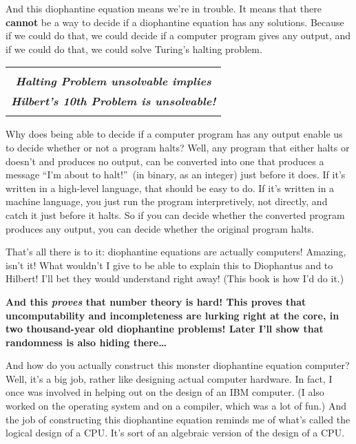 \documentclass[12pt]{book}
\begin{document}
And this diophantine equation means we're in trouble. It means that there \textbf{cannot}
be a way to decide if a diophantine equation has any solutions. Because if we could do that,
we could decide if a computer program gives any output, and if we could do that, we could
solve Turing's halting problem. 

\begin{center}
\begin{tabular}{|c|}
\hline
\\
\textbf{\emph{\large Halting Problem unsolvable implies}}
\\
\textbf{\emph{\large Hilbert's 10th Problem is unsolvable!}}
\\
\\
\hline
\end{tabular}
\end{center}

Why does being able to decide if a computer program has
any output enable us to decide whether or not a program halts? Well, any program that
either halts or doesn't and produces no output, can be converted into one that produces a message
``I'm about to halt!''\ (in binary, as an integer) just before it does.
If it's written in a high-level language, that should be easy to do.
If it's written in a machine language, you just run the program interpretively, not directly,
and catch it just before it halts.
So if you can decide whether the converted program produces any output, you can decide whether the
original program halts.
 
That's all there is to it: diophantine equations are actually computers!
Amazing, isn't it!  What wouldn't I give to be able to explain this to Diophantus and to Hilbert!
I'll bet they would understand right away!
(This book is how I'd do it.)
 
\textbf{And this \emph{\large proves} that number theory is hard! 
This proves that uncomputability and
incompleteness are lurking right at the core, in two thousand-year old diophantine problems!
Later I'll show that randomness is also hiding there\ldots}
 
And how do you actually construct this monster diophantine equation computer? Well, it's a big
job, rather like designing actual computer hardware.  In fact, I once was involved in helping
out on the design of an IBM computer. (I also worked on the operating system and on a compiler,
which was a lot of fun.)  And the job of constructing this diophantine equation reminds me
of what's called the logical design of a CPU.  It's sort of an algebraic version of the design of
a CPU.
 
\end{document}
